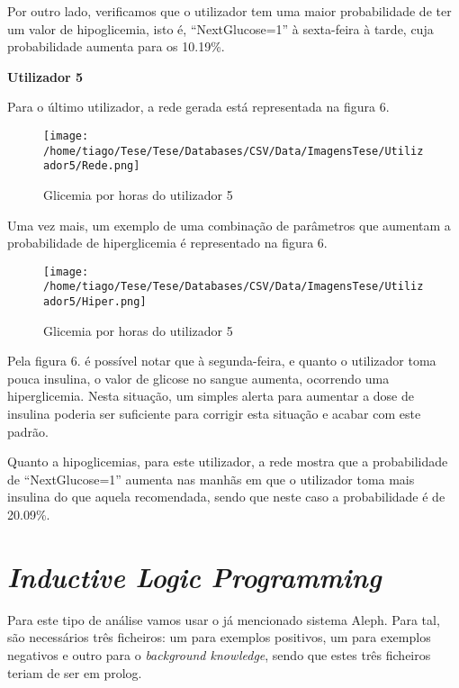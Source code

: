 Por outro lado, verificamos que o utilizador tem uma maior probabilidade de ter um valor de hipoglicemia, isto é, ``Next\textunderscore Glucose=1'' à sexta-feira à tarde, cuja probabilidade aumenta para os 10.19\%.


\textbf{Utilizador 5}


Para o último utilizador, a rede gerada está representada na figura 6.

\begin{figure}[H]
\centering
\texttt{[image: /home/tiago/Tese/Tese/Databases/CSV/Data/ImagensTese/Utilizador5/Rede.png]}
\caption{Glicemia por horas do utilizador 5}
\end{figure}
Uma vez mais, um exemplo de uma combinação de parâmetros que aumentam a probabilidade de hiperglicemia é representado na figura 6.

\begin{figure}[H]
\centering
\texttt{[image: /home/tiago/Tese/Tese/Databases/CSV/Data/ImagensTese/Utilizador5/Hiper.png]}
\caption{Glicemia por horas do utilizador 5}
\end{figure}
Pela figura 6. é possível notar que à segunda-feira, e quanto o utilizador toma pouca insulina, o valor de glicose no sangue aumenta, ocorrendo uma hiperglicemia. Nesta situação, um simples alerta para aumentar a dose de insulina poderia ser suficiente para corrigir esta situação e acabar com este padrão.

Quanto a hipoglicemias, para este utilizador, a rede mostra que a probabilidade de ``Next\textunderscore Glucose=1'' aumenta nas manhãs em que o utilizador toma mais insulina do que aquela recomendada, sendo que neste caso a probabilidade é de 20.09\%.


\section{\textit{Inductive Logic Programming}}

Para este tipo de análise vamos usar o já mencionado sistema Aleph. Para tal, são necessários três ficheiros: um para exemplos positivos, um para exemplos negativos e outro para o \textit{background knowledge}, sendo que estes três ficheiros teriam de ser em prolog. 
